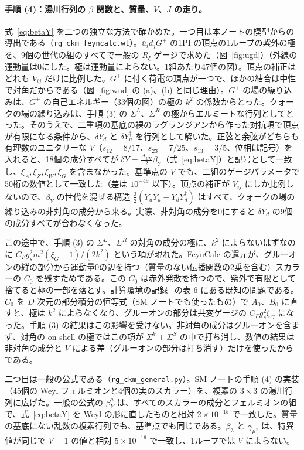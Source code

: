 \documentclass[a4paper,10pt]{ltjsarticle}
\newcommand{\DUV}{\Delta_{\mathrm{UV}}}
\begin{document}
\paragraph{手順 (4)：湯川行列の $\beta$ 関数と、質量、$V$、$J$ の走り。}式~\eqref{eq:betaY} を二つの独立な方法で確かめた。一つ目は本ノートの模型からの導出である（\texttt{rg\_ckm\_feyncalc.wl}）。$\bar u_id_jG^+$ の1PI の頂点の1ループの紫外の極を、9個の世代の組のすべてで一般の $R_\xi$ ゲージで求めた（図~\ref{fig:ugd}）（外線の運動量は0にした。極は運動量によらない。1組あたり47個の図）。頂点の補正はどれも $V_{ij}$ だけに比例した。$G^+$ に付く荷電の頂点が一つで、ほかの結合は中性で対角だからである（図~\ref{fig:wud} の (a)、(b) と同じ理由）。$G^+$ の場の繰り込みは、$G^+$ の自己エネルギー（33個の図）の極の $k^2$ の係数からとった。クォークの場の繰り込みは、手順 (3) の $\Sigma^L$、$\Sigma^R$ の極からエルミートな行列としてとった。そのうえで、二重項の基底の裸のラグランジアンから作った対抗項で頂点が有限になる条件から、$\delta Y_d$ と $\delta Y_u^\dagger$ を行列として解いた。正弦と余弦がどちらも有理数のユニタリーな $V$（$s_{12}=8/17$、$s_{23}=7/25$、$s_{13}=3/5$、位相は記号）を入れると、18個の成分すべてが $\delta Y=\frac{\DUV}2\beta_Y$（式~\eqref{eq:betaY}）と記号として一致し、$\xi_A,\xi_Z,\xi_W,\xi_G$ を含まなかった。基準点の $V$ でも、二組のゲージパラメータで50桁の数値として一致した（差は $10^{-49}$ 以下）。頂点の補正が $V_{ij}$ にしか比例しないので、$\beta_Y$ の世代を混ぜる構造 $\frac32(Y_uY_u^\dagger-Y_dY_d^\dagger)$ はすべて、クォークの場の繰り込みの非対角の成分から来る。実際、非対角の成分を0にすると $\delta Y_d$ の9個の成分すべてが合わなくなった。

この途中で、手順 (3) の $\Sigma^L$、$\Sigma^R$ の対角の成分の極に、$k^2$ によらないはずなのに $C_Fg_s^2m^2(\xi_G-1)/(2k^2)$ という項が現れた。FeynCalc の還元が、グルーオンの縦の部分から運動量0の辺を持つ（質量のない伝播関数の2乗を含む）スカラーの $C_0$ を残すためである。この $C_0$ は赤外発散を持つので、紫外で有限として捨てると極の一部を落とす。計算環境の記録~\cite{env} の表 6 にある既知の問題である。$C_0$ を $D$ 次元の部分積分の恒等式（SM ノートでも使ったもの）で $A_0$、$B_0$ に直すと、極は $k^2$ によらなくなり、グルーオンの部分は共変ゲージの $C_Fg_s^2\xi_G$ になった。手順 (3) の結果はこの影響を受けない。非対角の成分はグルーオンを含まず、対角の on-shell の極ではこの項が $\Sigma^V+\Sigma^S$ の中で打ち消し、数値の結果は非対角の成分と $V$ による差（グルーオンの部分は打ち消す）だけを使ったからである。

二つ目は一般の公式である（\texttt{rg\_ckm\_general.py}）。SM ノートの手順 (4) の実装（45個の Weyl フェルミオンと4個の実のスカラー）を、複素の $3\times3$ の湯川行列に広げた。一般の公式の $\beta_Y^a$ は、すべてのスカラーの成分とフェルミオンの組で、式~\eqref{eq:betaY} を Weyl の形に直したものと相対 $2\times10^{-15}$ で一致した。質量の基底にない乱数の複素行列でも、基準点でも同じである。$\beta_\lambda$ と $\gamma_{\mu^2}$ は、特異値が同じで $V=1$ の値と相対 $5\times10^{-16}$ で一致し、1ループでは $V$ によらない。
\end{document}
